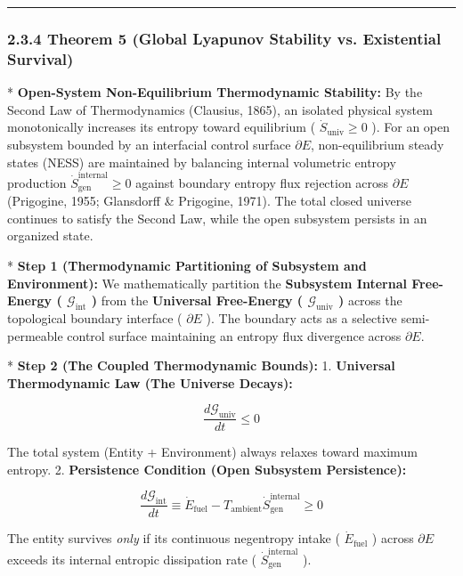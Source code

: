 \documentclass[11pt,a4paper]{article}
\theoremstyle{definition}\newtheorem{definition}{Definition}
\theoremstyle{remark}\newtheorem{remark}{Remark}
\begin{document}
\noindent\rule{\linewidth}{0.4pt}
\subsubsection{2.3.4 Theorem 5 (Global Lyapunov Stability vs. Existential Survival)}

* \textbf{Open-System Non-Equilibrium Thermodynamic Stability:} By the Second Law of Thermodynamics (Clausius, 1865), an isolated physical system monotonically increases its entropy toward equilibrium ( $\dot{S}_{\text{univ}} \ge 0$ ). For an open subsystem bounded by an interfacial control surface $\partial E$, non-equilibrium steady states (NESS) are maintained by balancing internal volumetric entropy production $\dot{S}_{\text{gen}}^{\text{internal}} \ge 0$ against boundary entropy flux rejection across $\partial E$ (Prigogine, 1955; Glansdorff \& Prigogine, 1971). The total closed universe continues to satisfy the Second Law, while the open subsystem persists in an organized state.

* \textbf{Step 1 (Thermodynamic Partitioning of Subsystem and Environment):}
We mathematically partition the \textbf{Subsystem Internal Free-Energy ( $\mathcal{G}_{\text{int}}$ )} from the \textbf{Universal Free-Energy ( $\mathcal{G}_{\text{univ}}$ )} across the topological boundary interface ( $\partial E$ ). The boundary acts as a selective semi-permeable control surface maintaining an entropy flux divergence across $\partial E$.

* \textbf{Step 2 (The Coupled Thermodynamic Bounds):}
1. \textbf{Universal Thermodynamic Law (The Universe Decays):}


\begin{equation}
\frac{d\mathcal{G}_{\text{univ}}}{dt} \le 0
\end{equation}


The total system (Entity + Environment) always relaxes toward maximum entropy.
2. \textbf{Persistence Condition (Open Subsystem Persistence):}


\begin{equation}
\frac{d\mathcal{G}_{\text{int}}}{dt} \equiv \dot{E}_{\text{fuel}} - T_{\text{ambient}} \dot{S}_{\text{gen}}^{\text{internal}} \ge 0
\end{equation}


The entity survives \textit{only} if its continuous negentropy intake ( $\dot{E}_{\text{fuel}}$ ) across $\partial E$ exceeds its internal entropic dissipation rate ( $\dot{S}_{\text{gen}}^{\text{internal}}$ ).
\end{document}

